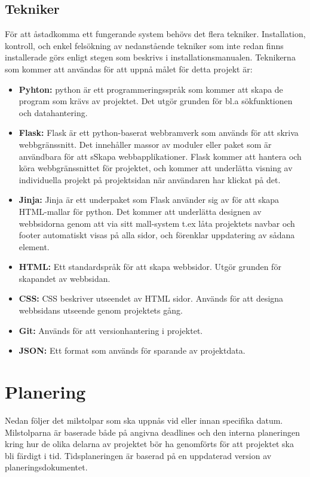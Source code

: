 \documentclass{TDP003mall}
\begin{document}
\subsection{Tekniker}
För att åstadkomma ett fungerande system behövs det flera tekniker. Installation, kontroll, och enkel felsökning av nedanstående tekniker som inte redan finns installerade görs enligt stegen som beskrivs i installationsmanualen. Teknikerna som kommer att användas för att uppnå målet för detta projekt är:
\begin{itemize}
\item \textbf{Pyhton:} python är ett programmeringsspråk som kommer att skapa de program som krävs av projektet. Det utgör grunden för bl.a sökfunktionen och datahantering.
\item \textbf{Flask:} Flask är ett python-baserat webbramverk som används för att skriva webbgränssnitt. Det innehåller massor av moduler eller paket som är användbara för att sSkapa webbapplikationer. Flask kommer att hantera och köra webbgränssnittet för projektet, och kommer att underlätta visning av individuella projekt på projektsidan när användaren har klickat på det. 
\item \textbf{Jinja:} Jinja är ett underpaket som Flask använder sig av för att skapa HTML-mallar för python. Det kommer att underlätta designen av webbsidorna genom att via sitt mall-system t.ex låta projektets navbar och footer automatiskt visas på alla sidor, och förenklar uppdatering av sådana element.
\item \textbf{HTML:} Ett standardspråk för att skapa webbsidor. Utgör grunden för skapandet av webbsidan.
\item \textbf{CSS:} CSS beskriver utseendet av HTML sidor. Används för att designa webbsidans utseende genom projektets gång.
\item \textbf{Git:} Används för att versionhantering i projektet.
\item \textbf{JSON:} Ett format som används för sparande av projektdata.

\end {itemize}

\newpage
\section{Planering}
Nedan följer det milstolpar som ska uppnås vid eller innan specifika datum. Milstolparna är baserade både på angivna deadlines och den interna planeringen kring hur de olika delarna av projektet bör ha genomförts för att projektet ska bli färdigt i tid. Tidsplaneringen är baserad på en uppdaterad version av planeringsdokumentet.
\end{document}
